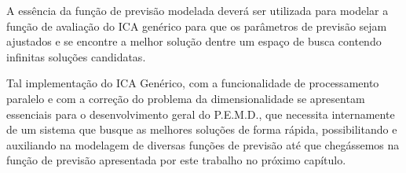 A essência da função de previsão modelada deverá ser utilizada para modelar a função de avaliação do ICA genérico para que os parâmetros de previsão sejam ajustados e se encontre a melhor solução dentre um espaço de busca contendo infinitas soluções candidatas.

Tal implementação do ICA Genérico, com a funcionalidade de processamento paralelo e com a correção do problema da dimensionalidade se apresentam essenciais para o desenvolvimento geral do P.E.M.D., que necessita internamente de um sistema que busque as melhores soluções de forma rápida, possibilitando e auxiliando na modelagem de diversas funções de previsão até que chegássemos na função de previsão apresentada por este trabalho no próximo capítulo.
